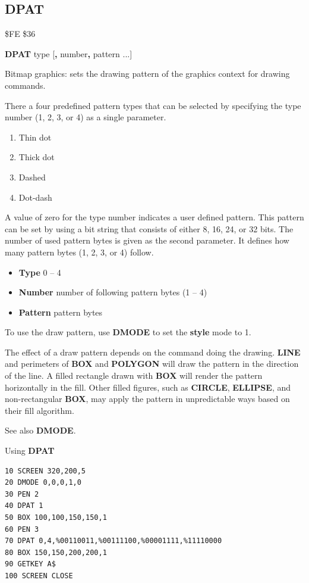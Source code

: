 \subsection{DPAT}
\begin{description}[leftmargin=2cm,style=nextline]
\item [Token:] \$FE \$36
\item [Format:] {\bf DPAT} type [{\bf,} number{\bf,} pattern ...]
\item [Usage:]
   Bitmap graphics: sets the drawing pattern
   of the graphics context for drawing commands.

   There a four predefined pattern types that can be selected
   by specifying the type number (1, 2, 3, or 4) as a single parameter.

   \begin{enumerate}
      \item Thin dot
      \item Thick dot
      \item Dashed
      \item Dot-dash
   \end{enumerate}

   A value of zero for the type number indicates a user defined pattern.
   This pattern can be set by using a bit string that consists of either 8, 16, 24, or 32 bits.
   The number of used pattern bytes is given as the second parameter.
   It defines how many pattern bytes (1, 2, 3, or 4) follow.

    \begin{itemize}
       \item {\bf Type}    0 -- 4
       \item {\bf Number}  number of following pattern bytes (1 -- 4)
       \item {\bf Pattern} pattern bytes
    \end{itemize}

\item[Remarks:]
    To use the draw pattern, use {\bf DMODE} to set the {\bf style} mode to 1.

    The effect of a draw pattern depends on the command doing the drawing. {\bf LINE} and perimeters of {\bf BOX} and {\bf POLYGON} will draw the pattern in the direction of the line. A filled rectangle drawn with {\bf BOX} will render the pattern horizontally in the fill. Other filled figures, such as {\bf CIRCLE}, {\bf ELLIPSE}, and non-rectangular {\bf BOX}, may apply the pattern in unpredictable ways based on their fill algorithm.

    See also {\bf DMODE}.

\item [Example:] Using {\bf DPAT}
\begin{tcolorbox}[colback=black,coltext=white]
\verbatimfont{\codefont}
\begin{verbatim}
10 SCREEN 320,200,5
20 DMODE 0,0,0,1,0
30 PEN 2
40 DPAT 1
50 BOX 100,100,150,150,1
60 PEN 3
70 DPAT 0,4,%00110011,%00111100,%00001111,%11110000
80 BOX 150,150,200,200,1
90 GETKEY A$
100 SCREEN CLOSE
\end{verbatim}
\end{tcolorbox}
\end{description}

